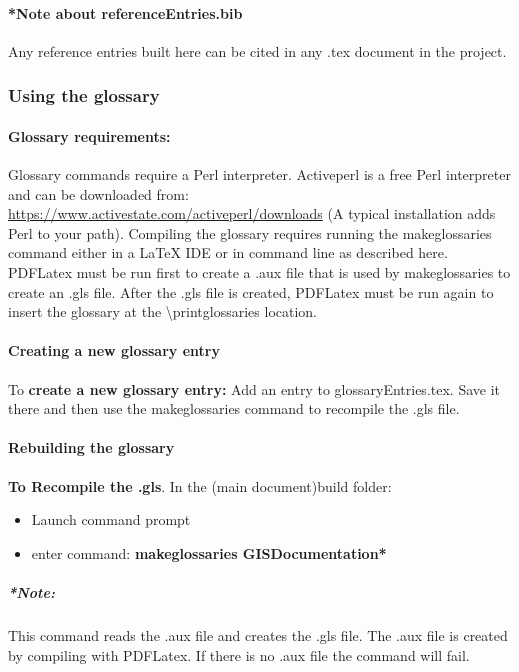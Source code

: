 \documentclass[class=book , crop=false]{standalone}
\begin{document}
\paragraph*{*Note about referenceEntries.bib}
{\footnotesize Any reference entries built here can be cited in any .tex document in the project.}

\subsubsection[Using the glossary]{{\Large Using the glossary}}
\paragraph{Glossary requirements:}
Glossary commands require a Perl interpreter.  Activeperl is a free Perl interpreter and can be downloaded from:\\ \href{https://www.activestate.com/activeperl/downloads}{https://www.activestate.com/activeperl/downloads}
{\tiny (A typical installation adds Perl to your path)}.  Compiling the glossary requires running the makeglossaries command either in a \LaTeX{} IDE or in command line as described here.  PDFLatex must be run first to create a .aux file that is used by makeglossaries to create an .gls file.  After the .gls file is created, PDFLatex must be run again to insert the glossary at the \textbackslash printglossaries location.
\paragraph{Creating a new glossary entry}
To \textbf{create a new glossary entry:} Add an entry to glossaryEntries.tex.  Save it there and then use the makeglossaries command to recompile the .gls file.
\paragraph{Rebuilding the glossary}
\textbf{To Recompile the .gls}.  In the (main document)build folder:
\begin{itemize}
\item Launch command prompt
\item enter command: \textbf{{\large makeglossaries GISDocumentation*}}
\end{itemize}
\subparagraph*{*Note:} {\footnotesize This command reads the .aux file and creates the .gls file.  The .aux file is created by compiling with PDFLatex.  If there is no .aux file the command will fail.}
\end{document}
